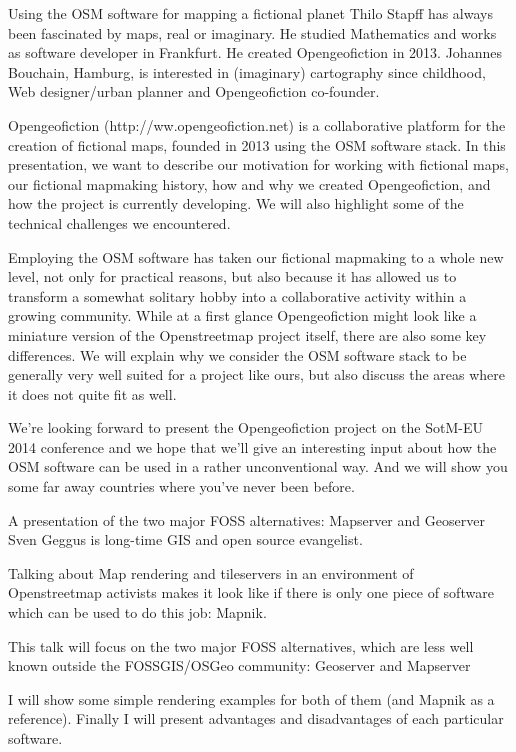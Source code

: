 %
{Using the OSM software for mapping a fictional planet}%
{Thilo Stapff has always been fascinated by maps, real or imaginary. 
He studied Mathematics and works as software developer in Frankfurt. He created
Opengeofiction in 2013. Johannes Bouchain, Hamburg, is interested in
(imaginary) cartography since childhood, Web designer/urban planner and
Opengeofiction co-founder.}%
{Opengeofiction (http://ww.opengeofiction.net) is a collaborative platform for the creation of fictional maps, founded in 2013 using the OSM software stack. In this presentation, we want to describe our motivation for working with fictional maps, our fictional mapmaking history, how and why we created Opengeofiction, and how the project is currently developing. We will also highlight some of the technical challenges we encountered.

Employing the OSM software has taken our fictional mapmaking to a whole new level, not only for practical reasons, but also because it has allowed us to transform a somewhat solitary hobby into a collaborative activity within a growing community. While at a first glance Opengeofiction might look like a miniature version of the Openstreetmap project itself, there are also some key differences. We will explain why we consider the OSM software stack to be generally very well suited for a project like ours, but also discuss the areas where it does not quite fit as well.

We're looking forward to present the Opengeofiction project on the SotM-EU 2014 conference and we hope that we'll give an interesting input about how the OSM software can be used in a rather unconventional way.  And we will show you some far away countries where you’ve never been before.}


%
{A presentation of the two major FOSS alternatives: Mapserver and Geoserver}%
{Sven Geggus is long-time GIS and open source evangelist.}%
{Talking about Map rendering and tileservers in an environment of Openstreetmap activists makes it look like if there is only one piece of software which can be used to do this job: Mapnik.

This talk will focus on the two major FOSS alternatives, which are less well
known outside the FOSSGIS/OSGeo community: Geoserver and Mapserver

I will show some simple rendering examples for both of them (and Mapnik as a reference). Finally I will present advantages and disadvantages of each particular software.}


